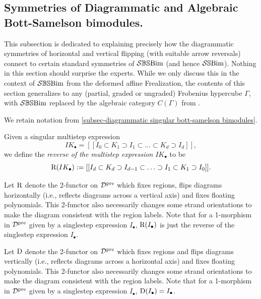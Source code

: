 %


\subsection{Symmetries of Diagrammatic and Algebraic Bott-Samelson bimodules.}\label{subsec reversal duality and phi}

This subsection is dedicated to explaining precisely how the diagrammatic symmetries of horizontal and vertical flipping (with suitable arrow reversals) connect to certain standard symmetries of $\mathcal{S}\mathbb{BS}\text{Bim}$ (and hence $\mathcal{S}\mathbb{S}\text{Bim}$). Nothing in this section should surprise the experts.
While we only discuss this in the context of $\mathcal{S}\mathbb{BS}\text{Bim}$ from the deformed affine Frealization, the contents of this section generalizes to any (partial, graded or ungraded) Frobenius hypercube $\Gamma$, with $\mathcal{S}\mathbb{BS}\text{Bim}$ replaced by the algebraic category $C(\Gamma)$ from \cite{EWSFrob}.

We retain notation from \cref{subsec-diagrammatic singular bott-samelson bimodules}.


\begin{defn}\label{defn reverse of singular multistep expression}
  Given a singular multistep expression  
  $$IK_{\bullet}=[[I_0 \subset K_1 \supset I_1 \subset \ldots \subset K_{d} \supset I_d]],$$
  we define the \emph{reverse of the multistep expression} $IK_\bullet$ to be
  $$\mathrm{R}(IK_\bullet):=[[I_d \subset K_{d} \supset I_{d-1} \subset \ldots \supset I_1 \subset K_1 \supset I_0 ]].$$
\end{defn}

\begin{defn}
    Let $\mathrm{R}$ denote the 2-functor on $\mathcal{D}^{\operatorname{pre}}$ which fixes regions, flips diagrams horizontally (i.e., reflects diagrams across a vertical axis) and  fixes floating polynomials. This 2-functor also necessarily changes some strand orientations to make the diagram consistent with the region labels. 
    Note that for a 1-morphism in $\mathcal{D}^{\operatorname{pre}}$ given by a singlestep expression $I_\bullet$, $\mathrm{R}(I_\bullet)$ is just the reverse of the singlestep expression $I_\bullet$.
\end{defn}

\begin{defn}
    Let $\mathrm{D}$ denote the 2-functor on $\mathcal{D}^{\operatorname{pre}}$ which fixes regions and flips diagrams vertically (i.e., reflects diagrams across a horizontal axis) and fixes floating polynomials. This 2-functor also necessarily changes some strand orientations to make the diagram consistent with the region labels. Note that for a 1-morphism in $\mathcal{D}^{\operatorname{pre}}$ given by a singlestep expression $I_\bullet$, $\mathrm{D}(I_\bullet)=I_\bullet$.
\end{defn}

